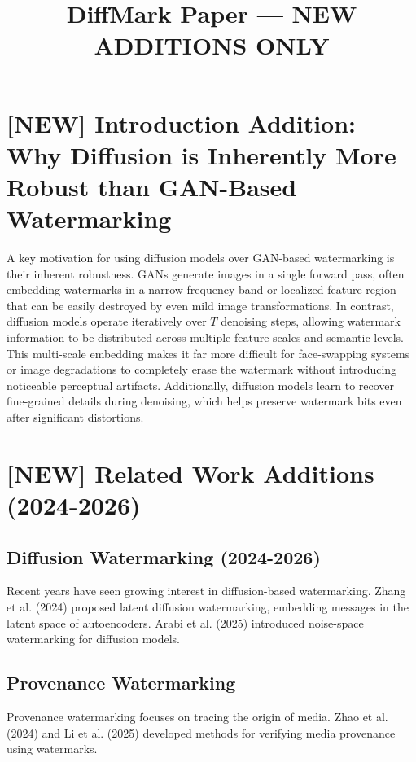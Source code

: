 \documentclass{article}
\title{DiffMark Paper — NEW ADDITIONS ONLY}
\author{}
\date{}
\begin{document}
\maketitle

\section{[NEW] Introduction Addition: Why Diffusion is Inherently More Robust than GAN-Based Watermarking}
A key motivation for using diffusion models over GAN-based watermarking is their inherent robustness. GANs generate images in a single forward pass, often embedding watermarks in a narrow frequency band or localized feature region that can be easily destroyed by even mild image transformations. In contrast, diffusion models operate iteratively over $T$ denoising steps, allowing watermark information to be distributed across multiple feature scales and semantic levels. This multi-scale embedding makes it far more difficult for face-swapping systems or image degradations to completely erase the watermark without introducing noticeable perceptual artifacts. Additionally, diffusion models learn to recover fine-grained details during denoising, which helps preserve watermark bits even after significant distortions.

\section{[NEW] Related Work Additions (2024-2026)}
\subsection{Diffusion Watermarking (2024-2026)}
Recent years have seen growing interest in diffusion-based watermarking. Zhang et al. (2024) proposed latent diffusion watermarking, embedding messages in the latent space of autoencoders. Arabi et al. (2025) introduced noise-space watermarking for diffusion models.

\subsection{Provenance Watermarking}
Provenance watermarking focuses on tracing the origin of media. Zhao et al. (2024) and Li et al. (2025) developed methods for verifying media provenance using watermarks.
\end{document}

